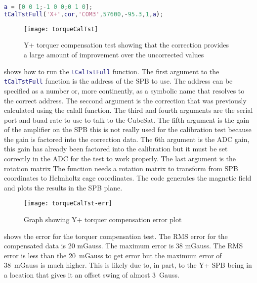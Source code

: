 \begin{lstlisting}[style=code,caption={Running torquer compensation test for the X+ \ac{SPB}},label={lst:tCalTst},language=Matlab]
a = [0 0 1;-1 0 0;0 1 0];
tCalTstFull('X+',cor,'COM3',57600,-95.3,1,a);
\end{lstlisting}

\begin{figure}[!ht]
    \centering
    \texttt{[image: torqueCalTst]}
  \caption{Y+ torquer compensation test showing that the correction provides a large amount of improvement over the uncorrected values}
    \label{fig:tqtst}
\end{figure}

 shows how to run the \lstinline[style=code,language=Matlab]$tCalTstFull$ function. The first argument to the \lstinline[style=code,language=Matlab]$tCalTstFull$ function is the address of the \ac{SPB} to use. The address can be specified as a number or, more continently, as a symbolic name that resolves to the correct address. The seccond argument is the correction that was previously calculated using the calall function. The third and fourth arguments are the serial port and buad rate to use to talk to the CubeSat. The fifth argument is the gain of the amplifier on the \ac{SPB} this is not really used for the calibration test because the gain is factored into the correction data. The 6th argument is the \ac{ADC} gain, this gain has already been factored into the calibration but it must be set correctly in the \ac{ADC} for the test to work properly. The last argument is the rotation matrix  The function needs a rotation matrix to transform from \ac{SPB} coordinates to Helmholtz cage coordinates. The code generates the magnetic field and plots the results in the \ac{SPB} plane.

\begin{sidewaysfigure}
    \centering
    \texttt{[image: torqueCalTst-err]}
    \caption{Graph showing Y+ torquer compensation error plot}
    \label{fig:tqerr}
\end{sidewaysfigure}

 shows the error for the torquer compensation test. The RMS error for the compensated data is 20 mGauss. The maximum error is 38 mGauss. The RMS error is less than the 20~mGauss to get {\textdegree} error but the maximum error of 38~mGauss is much higher. This is likely due to, in part, to the Y+ \ac{SPB} being in a location that gives it an offset swing of almost 3~Gauss.

